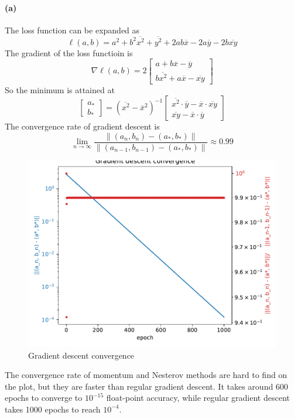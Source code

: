 \documentclass[12pt]{article}
\begin{document}
\paragraph{(a)}
The loss function can be expanded as
\[ \ell(a,b)= a^2 + b^2\overline{x^2}+ \overline{y^2} + 2ab\overline{x} - 2a\overline{y} - 2b \overline{xy} \]
The gradient of the loss functioin is
\[ \nabla\ell(a,b) = 2\begin{bmatrix}
    a+b\overline{x}-\overline{y} \\
    b\overline{x^2}+a\overline{x}-\overline{xy}
\end{bmatrix} \]
So the minimum is attained at
\[ \begin{bmatrix} a_* \\ b_* \end{bmatrix} = \left(\overline{x^2}-\overline{x}^2 \right)^{-1} \begin{bmatrix}
    \overline{x^2}\cdot\overline{y} - \overline{x}\cdot\overline{xy} \\
    \overline{xy} - \overline{x}\cdot\overline{y}
\end{bmatrix} \]
The convergence rate of gradient descent is
\[ \lim_{n\to\infty}\frac{\|(a_n,b_n)-(a_*,b_*)\|}{\|(a_{n-1},b_{n-1})-(a_*,b_*)\|}\approx0.99 \]
\begin{figure}[htbp]
    \includegraphics{Homework1/ex2b.pdf}
    \caption{Gradient descent convergence}
\end{figure}
The convergence rate of momentum and Nesterov methods are hard to find on the plot, but they are faster than regular gradient descent.
It takes around 600 epochs to converge to \(10^{-15}\) float-point accuracy, while regular gradient descent takes 1000 epochs to reach \(10^{-4}\).
\end{document}
